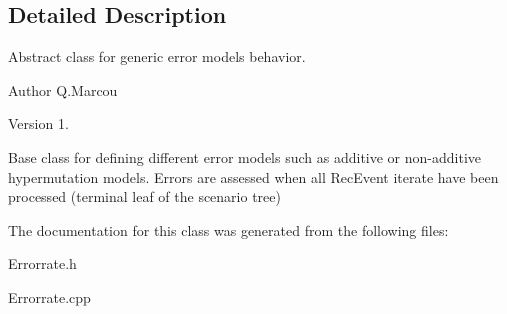 \subsection{Detailed Description}
Abstract class for generic error models behavior. 

\begin{DoxyAuthor}{Author}
Q.\+Marcou 
\end{DoxyAuthor}
\begin{DoxyVersion}{Version}
1.
\end{DoxyVersion}
Base class for defining different error models such as additive or non-\/additive hypermutation models. Errors are assessed when all Rec\+Event iterate have been processed (terminal leaf of the scenario tree) 

The documentation for this class was generated from the following files\+:\begin{DoxyCompactItemize}
\item 
Errorrate.\+h\item 
Errorrate.\+cpp\end{DoxyCompactItemize}
